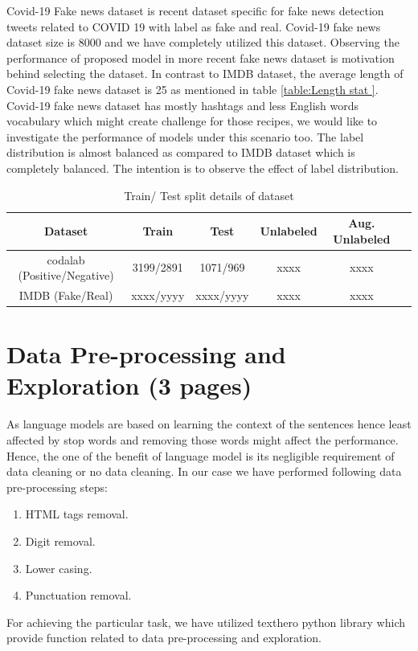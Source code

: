 \documentclass[%
	BCOR=8mm, %
	DIV=12, 
	toc=bibliography, %
	toc=listof, %
	oneside, %
	egregdoesnotlikesansseriftitles, %
	]{scrbook}
\begin{document}
Covid-19 Fake news dataset  is recent dataset specific for fake news detection tweets related to COVID 19 with label as fake and real.  Covid-19 fake news dataset size is 8000 and we have completely utilized this dataset. Observing the performance of proposed model in more recent fake news dataset is motivation behind selecting the dataset. In contrast to IMDB dataset, the average length of Covid-19 fake news dataset is 25 as mentioned in table \ref{table:Length stat }.
Covid-19 fake news dataset has mostly hashtags and less English words vocabulary which might create challenge for those recipes, we would like to investigate the performance of models under this scenario too. 
The label distribution is almost balanced as compared to IMDB dataset which is completely balanced. The intention is to observe the effect of label distribution.
\begin{table}[!h]
\centering
\begin{tabular}{ |c|c|c|c|c|c| } 
\hline
Dataset & Train & Test & Unlabeled & Aug. Unlabeled \\
\hline
codalab (Positive/Negative) & 3199/2891 & 1071/969 & xxxx & xxxx \\ 
IMDB (Fake/Real) & xxxx/yyyy & xxxx/yyyy & xxxx & xxxx \\
\hline
\end{tabular}
\caption[Train/Augment test data]{Train/ Test split details of dataset }
\label{table:train/test table }
\end{table}
\section{Data Pre-processing and Exploration (3 pages)}
As language models are based on learning the context of the sentences hence least affected by stop words and removing those words might affect the performance. Hence, the one of the benefit of language model is its negligible requirement of data cleaning or no data cleaning. In our case we have performed following data pre-processing steps:
\begin{enumerate}
\item  HTML tags removal.
\item Digit removal.
\item Lower casing.
\item  Punctuation removal.
\end{enumerate}
For achieving the particular task, we have utilized texthero python library which provide function related to data pre-processing and exploration. 
\end{document}
